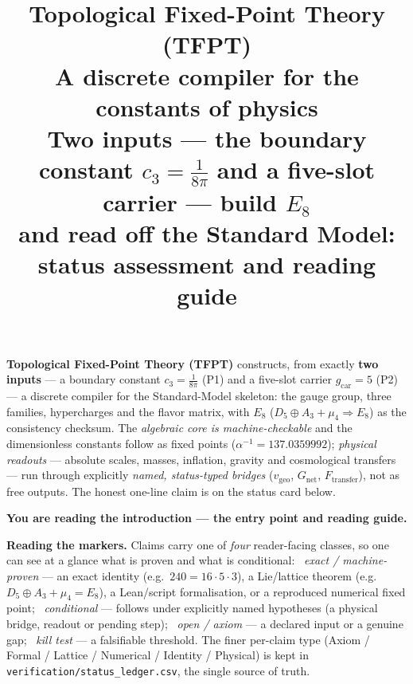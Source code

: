 \documentclass[11pt,a4paper]{article}
\title{\vspace{-1.2cm}\textbf{Topological Fixed-Point Theory (TFPT)}\\[1.5mm]
\Large A discrete compiler for the constants of physics\\[2.5mm]
\large Two inputs --- the boundary constant $c_3=\tfrac1{8\pi}$ and a five-slot carrier --- build $E_8$\\
and read off the Standard Model: status assessment and reading guide}
\author{\TFPTauthors}
\date{\TFPTdatestamp}
\newcommand{\cthree}{c_3}
\newcommand{\gcar}{g_{\mathrm{car}}}
\newcommand{\ainv}{\alpha^{-1}}
\begin{document}
\maketitle
\vspace{-0.8cm}

\begin{keyboxnb}
\textbf{Topological Fixed-Point Theory (TFPT)} constructs, from exactly \textbf{two inputs} --- a boundary
constant $\cthree=\tfrac1{8\pi}$ (P1) and a five-slot carrier $\gcar=5$ (P2) --- a discrete compiler for
the Standard-Model skeleton: the gauge group, three families, hypercharges and the flavor matrix, with
$E_8$ ($D_5\oplus A_3+\mu_4\Rightarrow E_8$) as the consistency checksum. The \emph{algebraic core is
machine-checkable} and the dimensionless constants follow as fixed points ($\ainv=137.0359992$);
\emph{physical readouts} --- absolute scales, masses, inflation, gravity and cosmological transfers ---
run through explicitly \emph{named, status-typed bridges} ($v_{\mathrm{geo}}$, $G_{\mathrm{net}}$,
$F_{\mathrm{transfer}}$), not as free outputs. The honest one-line claim is on the status card below.
\end{keyboxnb}


\noindent\textbf{You are reading the \textbf{introduction} --- the entry point and reading guide.}


\TFPTbadges
\TFPTclaimstack[none]


\tableofcontents

\noindent\textbf{Reading the markers.} Claims carry one of \emph{four} reader-facing classes, so one can
see at a glance what is proven and what is conditional:
\mE\ \emph{exact / machine-proven} --- an exact identity (e.g.\ $240=16\cdot5\cdot3$), a Lie/lattice
theorem (e.g.\ $D_5{\oplus}A_3{+}\mu_4{=}E_8$), a Lean/script formalisation, or a reproduced numerical
fixed point;
\mC\ \emph{conditional} --- follows under explicitly named hypotheses (a physical bridge, readout or
pending step);
\mO\ \emph{open / axiom} --- a declared input or a genuine gap;
\mX\ \emph{kill test} --- a falsifiable threshold.
The finer per-claim type (Axiom / Formal / Lattice / Numerical / Identity / Physical) is kept in
\texttt{verification/status\_ledger.csv}, the single source of truth.
\end{document}
